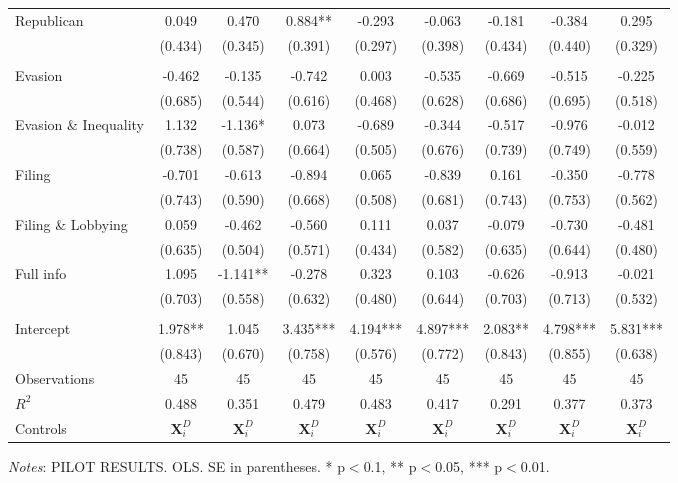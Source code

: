 \documentclass[11pt]{article}
\begin{document}
\begin{landscape}
\begin{table}[!htbp]
\begin{threeparttable}
\begin{tabular}{l|cccccccc}
Republican & 0.049 & 0.470 & 0.884** & -0.293 & -0.063 & -0.181 & -0.384 & 0.295 \\
 & (0.434) & (0.345) & (0.391) & (0.297) & (0.398) & (0.434) & (0.440) & (0.329) \\
\\[0.5em]
Evasion & -0.462 & -0.135 & -0.742 & 0.003 & -0.535 & -0.669 & -0.515 & -0.225 \\
 & (0.685) & (0.544) & (0.616) & (0.468) & (0.628) & (0.686) & (0.695) & (0.518) \\
Evasion \& Inequality & 1.132 & -1.136* & 0.073 & -0.689 & -0.344 & -0.517 & -0.976 & -0.012 \\
 & (0.738) & (0.587) & (0.664) & (0.505) & (0.676) & (0.739) & (0.749) & (0.559) \\
Filing & -0.701 & -0.613 & -0.894 & 0.065 & -0.839 & 0.161 & -0.350 & -0.778 \\
 & (0.743) & (0.590) & (0.668) & (0.508) & (0.681) & (0.743) & (0.753) & (0.562) \\
Filing \& Lobbying & 0.059 & -0.462 & -0.560 & 0.111 & 0.037 & -0.079 & -0.730 & -0.481 \\
 & (0.635) & (0.504) & (0.571) & (0.434) & (0.582) & (0.635) & (0.644) & (0.480) \\
Full info & 1.095 & -1.141** & -0.278 & 0.323 & 0.103 & -0.626 & -0.913 & -0.021 \\
 & (0.703) & (0.558) & (0.632) & (0.480) & (0.644) & (0.703) & (0.713) & (0.532) \\
\\[0.5em]
Intercept & 1.978** & 1.045 & 3.435*** & 4.194*** & 4.897*** & 2.083** & 4.798*** & 5.831*** \\
 & (0.843) & (0.670) & (0.758) & (0.576) & (0.772) & (0.843) & (0.855) & (0.638) \\
\midrule
Observations & 45 & 45 & 45 & 45 & 45 & 45 & 45 & 45 \\
$R^2$ & 0.488 & 0.351 & 0.479 & 0.483 & 0.417 & 0.291 & 0.377 & 0.373 \\
Controls & $\mathbf{X}_{i}^{D}$ & $\mathbf{X}_{i}^{D}$ & $\mathbf{X}_{i}^{D}$ & $\mathbf{X}_{i}^{D}$ & $\mathbf{X}_{i}^{D}$ & $\mathbf{X}_{i}^{D}$ & $\mathbf{X}_{i}^{D}$ & $\mathbf{X}_{i}^{D}$ \\
\bottomrule
\end{tabular}
\begin{tablenotes}[flushleft]
\footnotesize
\item \textit{Notes}: PILOT RESULTS. OLS. SE in parentheses. * p$<$0.1, ** p$<$0.05, *** p$<$0.01.
\end{tablenotes}
\end{threeparttable}
\end{table}
\end{landscape}
\end{document}

